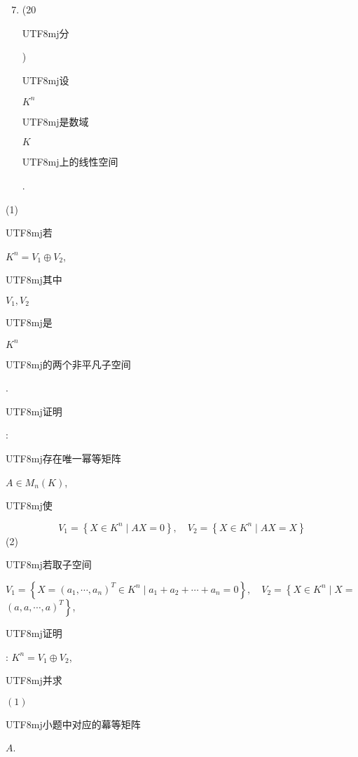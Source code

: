 \documentclass[10pt]{article}
\begin{document}
\begin{enumerate}
  \setcounter{enumi}{6}
  \item (20 \begin{CJK}{UTF8}{mj}分\end{CJK}) \begin{CJK}{UTF8}{mj}设\end{CJK} $K^{n}$ \begin{CJK}{UTF8}{mj}是数域\end{CJK} $K$ \begin{CJK}{UTF8}{mj}上的线性空间\end{CJK}.
\end{enumerate}
(1) \begin{CJK}{UTF8}{mj}若\end{CJK} $K^{n}=V_{1} \oplus V_{2}$, \begin{CJK}{UTF8}{mj}其中\end{CJK} $V_{1}, V_{2}$ \begin{CJK}{UTF8}{mj}是\end{CJK} $K^{n}$ \begin{CJK}{UTF8}{mj}的两个非平凡子空间\end{CJK}. \begin{CJK}{UTF8}{mj}证明\end{CJK}: \begin{CJK}{UTF8}{mj}存在唯一幂等矩阵\end{CJK} $A \in M_{n}(K)$, \begin{CJK}{UTF8}{mj}使\end{CJK}
$$
V_{1}=\left\{X \in K^{n} \mid A X=0\right\}, \quad V_{2}=\left\{X \in K^{n} \mid A X=X\right\}
$$
(2) \begin{CJK}{UTF8}{mj}若取子空间\end{CJK} $V_{1}=\left\{X=\left(a_{1}, \cdots, a_{n}\right)^{T} \in K^{n} \mid a_{1}+a_{2}+\cdots+a_{n}=0\right\}, \quad V_{2}=\left\{X \in K^{n} \mid X=\right.$ $\left.(a, a, \cdots, a)^{T}\right\}$, \begin{CJK}{UTF8}{mj}证明\end{CJK}: $K^{n}=V_{1} \oplus V_{2}$,\begin{CJK}{UTF8}{mj}并求\end{CJK} $(1)$ \begin{CJK}{UTF8}{mj}小题中对应的幕等矩阵\end{CJK} $A$.
\end{document}
